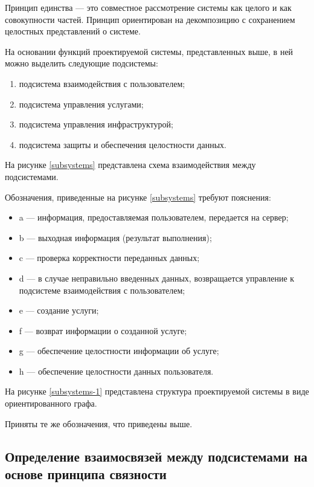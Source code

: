 Принцип единства --- это совместное рассмотрение системы как целого и как совокупности частей.
Принцип ориентирован на декомпозицию с сохранением целостных представлений о системе.

На основании функций проектируемой системы, представленных выше, в ней можно выделить следующие подсистемы:
\begin{enumerate}
  \item подсистема взаимодействия с пользователем;
  \item подсистема управления услугами;
  \item подсистема управления инфраструктурой;
  \item подсистема защиты и обеспечения целостности данных.
\end{enumerate}

На рисунке \ref{subsystems} представлена схема взаимодействия между подсистемами.

Обозначения, приведенные на рисунке \ref{subsystems} требуют пояснения:
\begin{itemize}[label={}]
  \item a --- информация, предоставляемая пользователем, передается на сервер;
  \item b --- выходная информация (результат выполнения);
  \item c --- проверка корректности переданных данных;
  \item d --- в случае неправильно введенных данных, возвращается управление к подсистеме взаимодействия с пользователем;
  \item e --- создание услуги;
  \item f --- возврат информации о созданной услуге;
  \item g --- обеспечение целостности информации об услуге;
  \item h --- обеспечение целостности данных пользователя.
\end{itemize}

На рисунке \ref{subsystems-1} представлена структура проектируемой системы в виде ориентированного графа.

Приняты те же обозначения, что приведены выше.

\subsection{Определение взаимосвязей между подсистемами на основе принципа связности}

